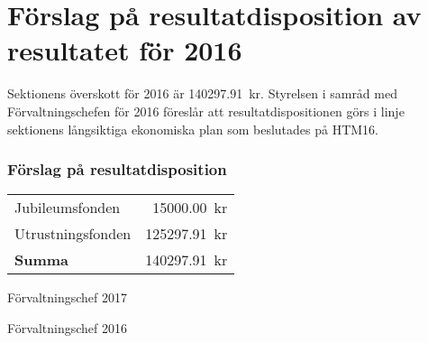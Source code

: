 \documentclass[../_main/handlingar.tex]{subfiles}
\begin{document}
\section{Förslag på resultatdisposition av resultatet för 2016}
Sektionens överskott för 2016 är \SI{140297.91}{kr}. Styrelsen i samråd med Förvaltningschefen för 2016 föreslår att resultatdispositionen görs i linje sektionens långsiktiga ekonomiska plan som beslutades på HTM16. 
\subsubsection{Förslag på resultatdisposition}
\begin{tabular}{l r}
    Jubileumsfonden & \SI{15000.00}{kr} \\
    Utrustningsfonden & \SI{125297.91}{kr} \\
    \hline
    \textbf{Summa} & \SI{140297.91}{kr} \\
\end{tabular}

\begin{signatures}{2}
    \ist
    \signature{Sophia Grimmeiss Grahm}{Förvaltningschef 2017}
    \signature{Anders Nilsson}{Förvaltningschef 2016}
\end{signatures}
\end{document}
